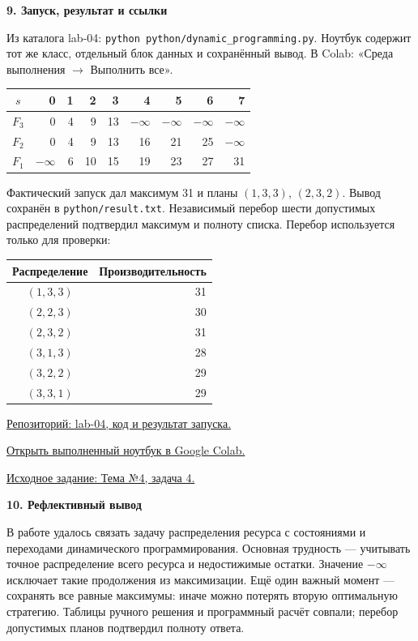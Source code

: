 \documentclass[12pt,a4paper]{article}
\newcommand{\head}[1]{\medskip\textbf{#1}\par}
\begin{document}
\newpage
\head{9. Запуск, результат и ссылки}
Из каталога lab-04: \texttt{python python/dynamic\_programming.py}.
Ноутбук содержит тот же класс, отдельный блок данных и сохранённый вывод.
В Colab: «Среда выполнения $\to$ Выполнить все».
\begin{center}\begin{tabular}{c|rrrrrrrr}
$s$&0&1&2&3&4&5&6&7\\\hline
$F_3$&0&4&9&13&$-\infty$&$-\infty$&$-\infty$&$-\infty$\\
$F_2$&0&4&9&13&16&21&25&$-\infty$\\
$F_1$&$-\infty$&6&10&15&19&23&27&31
\end{tabular}\end{center}
Фактический запуск дал максимум 31 и планы $(1,3,3)$, $(2,3,2)$.
Вывод сохранён в \texttt{python/result.txt}. Независимый перебор шести
допустимых распределений подтвердил максимум и полноту списка.
Перебор используется только для проверки:
\begin{center}\begin{tabular}{c|r}
Распределение&Производительность\\\hline
$(1,3,3)$&31\\$(2,2,3)$&30\\$(2,3,2)$&31\\
$(3,1,3)$&28\\$(3,2,2)$&29\\$(3,3,1)$&29
\end{tabular}\end{center}
\href{https://github.com/Doney888/methods-of-optimization/tree/main/lab-04}{Репозиторий: lab-04, код и результат запуска.}

\href{https://colab.research.google.com/github/Doney888/methods-of-optimization/blob/main/lab-04/python/lab04-dynamic-programming.ipynb}{Открыть выполненный ноутбук в Google Colab.}

\href{https://drive.google.com/file/d/1oUGdd_os__GuU4qecMRgTcuhiaJS0kQc/view}{Исходное задание: Тема №4, задача 4.}

\head{10. Рефлективный вывод}
В работе удалось связать задачу распределения ресурса с состояниями и
переходами динамического программирования. Основная трудность --- учитывать
точное распределение всего ресурса и недостижимые остатки.
Значение $-\infty$ исключает такие продолжения из максимизации.
Ещё один важный момент --- сохранять все равные максимумы: иначе можно
потерять вторую оптимальную стратегию. Таблицы ручного решения и
программный расчёт совпали; перебор допустимых планов подтвердил полноту ответа.
\end{document}
